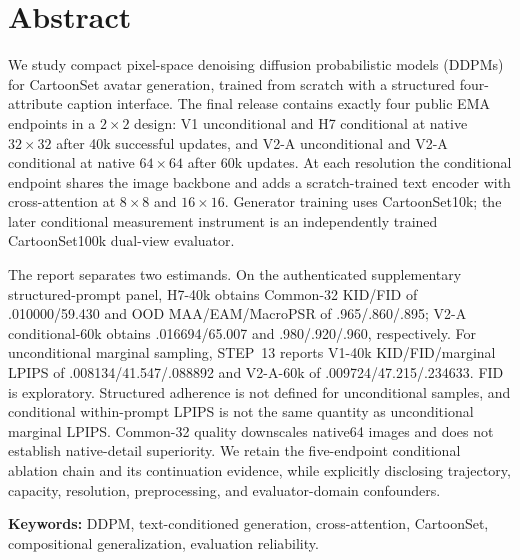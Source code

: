 \section*{Abstract}
We study compact pixel-space denoising diffusion probabilistic models (DDPMs) for CartoonSet avatar generation, trained from scratch with a structured four-attribute caption interface. The final release contains exactly four public EMA endpoints in a $2\times2$ design: V1 unconditional and H7 conditional at native $32\times32$ after 40k successful updates, and V2-A unconditional and V2-A conditional at native $64\times64$ after 60k updates. At each resolution the conditional endpoint shares the image backbone and adds a scratch-trained text encoder with cross-attention at $8\times8$ and $16\times16$. Generator training uses CartoonSet10k; the later conditional measurement instrument is an independently trained CartoonSet100k dual-view evaluator.

The report separates two estimands. On the authenticated supplementary structured-prompt panel, H7-40k obtains Common-32 KID/FID of .010000/59.430 and OOD MAA/EAM/MacroPSR of .965/.860/.895; V2-A conditional-60k obtains .016694/65.007 and .980/.920/.960, respectively. For unconditional marginal sampling, STEP~13 reports V1-40k KID/FID/marginal LPIPS of .008134/41.547/.088892 and V2-A-60k of .009724/47.215/.234633. FID is exploratory. Structured adherence is not defined for unconditional samples, and conditional within-prompt LPIPS is not the same quantity as unconditional marginal LPIPS. Common-32 quality downscales native64 images and does not establish native-detail superiority. We retain the five-endpoint conditional ablation chain and its continuation evidence, while explicitly disclosing trajectory, capacity, resolution, preprocessing, and evaluator-domain confounders.

\noindent\textbf{Keywords:} DDPM, text-conditioned generation, cross-attention, CartoonSet, compositional generalization, evaluation reliability.
